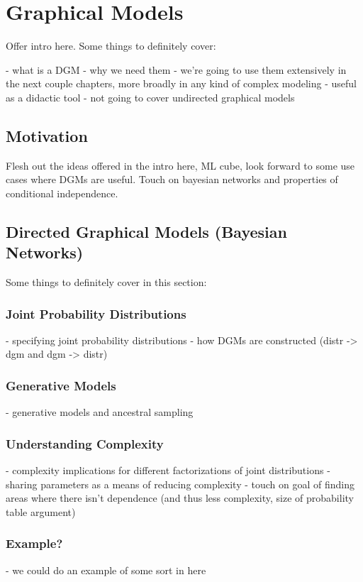 \chapter{Graphical Models}
Offer intro here. Some things to definitely cover:

- what is a DGM
- why we need them
- we're going to use them extensively in the next couple chapters, more broadly in any kind of complex modeling
- useful as a didactic tool
- not going to cover undirected graphical models

\section{Motivation}
Flesh out the ideas offered in the intro here, ML cube, look forward to some use cases where DGMs are useful. Touch on bayesian networks and properties of conditional independence.

\section{Directed Graphical Models (Bayesian Networks)}
Some things to definitely cover in this section:

\subsection{Joint Probability Distributions}
- specifying joint probability distributions
- how DGMs are constructed (distr -> dgm and dgm -> distr)

\subsection{Generative Models}
- generative models and ancestral sampling

\subsection{Understanding Complexity}
- complexity implications for different factorizations of joint distributions
- sharing parameters as a means of reducing complexity
- touch on goal of finding areas where there isn't dependence (and thus less complexity, size of probability table argument)

\subsection{Example?}
- we could do an example of some sort in here

